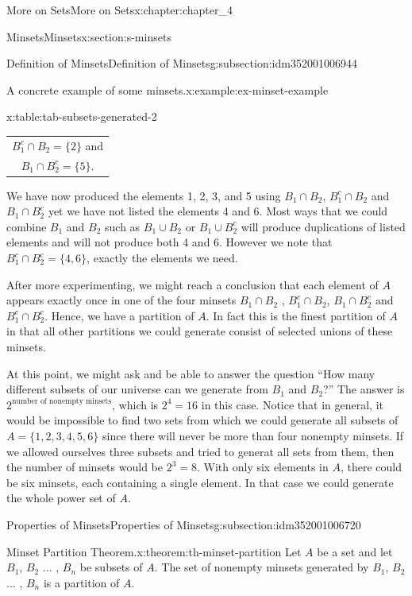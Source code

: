 \documentclass[oneside,10pt,]{book}
\newcommand{\tabularfont}{\relax}
\begin{document}
\begin{chapterptx}{More on Sets}{}{More on Sets}{}{}{x:chapter:chapter_4}
\begin{sectionptx}{Minsets}{}{Minsets}{}{}{x:section:s-minsets}
\begin{subsectionptx}{Definition of Minsets}{}{Definition of Minsets}{}{}{g:subsection:idm352001006944}
\begin{example}{A concrete example of some minsets.}{x:example:ex-minset-example}
\begin{tableptx}{\textbf{}}{x:table:tab-subsets-generated-2}{}%
\centering
{\tabularfont%
\begin{tabular}{c}
\(B_1^c\cap B_2=\{2\}\) and\tabularnewline[0pt]
\(B_1\cap B_2^c=\{5\}\).
\end{tabular}
}%
\end{tableptx}%
We have now produced the elements 1, 2, 3, and 5 using \(B_1\cap B_2\),  \(B_1^c\cap B_2\) and \(B_1\cap B_2^c\) yet we have not listed the elements 4 and 6. Most ways that we could combine \(B_1\) and \(B_2\) such as \(B_1\cup B_2\) or \(B_1\cup B_2^c\) will produce duplications of listed elements and will not produce both 4 and 6. However we note that \(B_1^c\cap B_2^c= \{4, 6\}\), exactly the elements we need.%
\par
After more experimenting, we might reach a conclusion that each element of \(A\) appears exactly once in one of the four minsets \(B_1\cap B_2\) ,  \(B_1^c\cap B_2\), \(B_1\cap B_2^c\) and \(B_1^c\cap B_2^c\). Hence, we have a partition of \(A\). In fact this is the finest partition of \(A\) in that all other partitions we could generate consist of selected unions of these minsets.%
\par
At this point, we might ask and be able to answer the question ``How many different subsets of our universe can we generate from  \(B_1\) and \(B_2\)?''  The answer is \(2^{\textrm{number of nonempty minsets}}\), which is \(2^4=16\) in this case.  Notice that in general, it would be impossible to find two sets from which we could generate all subsets of \(A=\{1, 2, 3, 4, 5, 6\}\) since there will never be more than four nonempty minsets.   If we allowed ourselves three subsets and tried to generat all sets from them, then the number of minsets would be \(2^3 =8\).  With only six elements in \(A\), there could be six minsets, each containing a single element.  In that case we could generate the whole power set of \(A\).%
\end{example}
\end{subsectionptx}
%
%
\typeout{************************************************}
\typeout{************************************************}
%
\begin{subsectionptx}{Properties of Minsets}{}{Properties of Minsets}{}{}{g:subsection:idm352001006720}
\begin{theorem}{Minset Partition Theorem.}{}{x:theorem:th-minset-partition}%
Let \(A\) be a set and let \(B_1\), \(B_2\) \(\ldots\)  , \(B_n\) be subsets of \(A\). The set of nonempty minsets generated by  \(B_1\), \(B_2\) \(\ldots\)  , \(B_n\) is a partition of \(A\).%

\end{theorem}
\end{subsectionptx}
\end{sectionptx}
\end{chapterptx}
\end{document}
